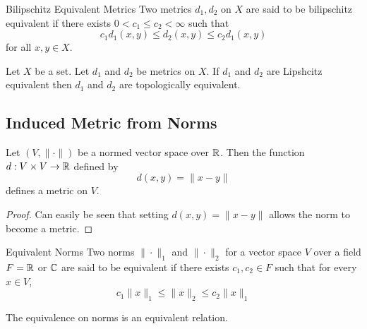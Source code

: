 \documentclass[a4paper]{article}
\begin{document}
\begin{defn}{Bilipschitz Equivalent Metrics}{} Two metrics $d_1,d_2$ on $X$ are said to be bilipschitz equivalent if there exists $0<c_1\leq c_2<\infty$ such that $$c_1d_1(x,y)\leq d_2(x,y)\leq c_2d_1(x,y)$$ for all $x,y\in X$. 
\end{defn}

\begin{lmm}{}{} Let $X$ be a set. Let $d_1$ and $d_2$ be metrics on $X$. If $d_1$ and $d_2$ are Lipshcitz equivalent then $d_1$ and $d_2$ are topologically equivalent. 
\end{lmm}

\subsection{Induced Metric from Norms}
\begin{prp}{}{} Let $(V,\|\cdot\|)$ be a normed vector space over $\mathbb{R}$. Then the function $d:V\times V\to\mathbb{R}$ defined by $$d(x,y)=\|x-y\|$$ defines a metric on $V$. 
\begin{proof} Can easily be seen that setting $d(x,y)=\|x-y\|$ allows the norm to become a metric. 
\end{proof}
\end{prp}

\begin{defn}{Equivalent Norms}{} Two norms $\|\cdot\|_1$ and $\|\cdot\|_2$ for a vector space $V$ over a field $F=\mathbb{R}$ or $\mathbb{C}$ are said to be equivalent if there exists $c_1,c_2\in F$ such that for every $x\in V$, $$c_1\|x\|_1\leq\|x\|_2\leq c_2\|x\|_1$$
\end{defn}

\begin{prp}{}{} The equivalence on norms is an equivalent relation. 
\end{prp}
\end{document}
